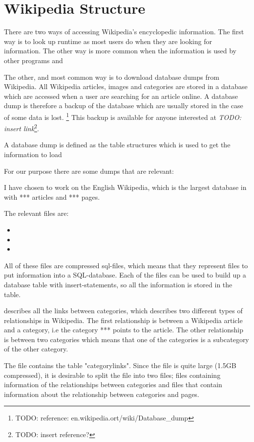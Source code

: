 \section{Wikipedia Structure}
There are two ways of accessing Wikipedia's encyclopedic information. The first way is to look up runtime as most users do when they are looking for information. The other way is more common when the information is used by other programs and


The other, and most common way is to download database dumps from Wikipedia. All Wikipedia articles, images and categories are stored in a database which are accessed when a user are searching for an article online. A database dump is therefore a backup of the database which are usually stored in the case of some data is lost. \footnote{TODO: reference: en.wikipedia.ort/wiki/Database\_dump} This backup is available for anyone interested at \emph{TODO: insert link}\footnote{TODO: insert reference?}. 




A database dump is defined as the table structures which is used to get the information to load

For our purpose there are some dumps that are relevant: 


I have chosen to work on the English Wikipedia, which is the largest database in with *** articles and *** pages. 

The relevant files are: 
\begin{itemize}
\item \enwikicatlink
\item \enwikipage
\item \enwikicategory
\end{itemize}

All of these files are compressed sql-files, which means that they represent files to put information into a SQL-database. Each of the files can be used to build up a database table with insert-statements, so all the information is stored in the table. 

\enwikicatlink describes all the links between categories, which describes two different types of relationships in Wikipedia. The first relationship is between a Wikipedia article and a category, i.e the category *** points to the article. The other relationship is between two categories which means that one of the categories is a subcategory of the other category. 

The file contains the table "categorylinks". Since the file is quite large (1.5GB compressed), it is desirable to split the file into two files; files containing information of the relationships between categories and files that contain information about the relationship between categories and pages. 
